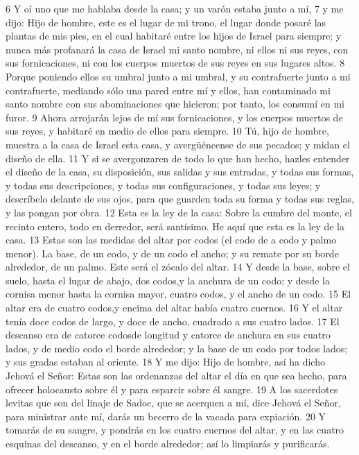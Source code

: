 6 Y oí uno que me hablaba desde la casa; y un varón estaba junto a mí,
7 y me dijo: Hijo de hombre, este es el lugar de mi trono, el lugar donde posaré las plantas de mis pies, en el cual habitaré entre los hijos de Israel para siempre; y nunca más profanará la casa de Israel mi santo nombre, ni ellos ni sus reyes, con sus fornicaciones, ni con los cuerpos muertos de sus reyes en sus lugares altos.
8 Porque poniendo ellos su umbral junto a mi umbral, y su contrafuerte junto a mi contrafuerte, mediando sólo una pared entre mí y ellos, han contaminado mi santo nombre con sus abominaciones que hicieron; por tanto, los consumí en mi furor.
9 Ahora arrojarán lejos de mí sus fornicaciones, y los cuerpos muertos de sus reyes, y habitaré en medio de ellos para siempre.
10 Tú, hijo de hombre, muestra a la casa de Israel esta casa, y avergüéncense de sus pecados; y midan el diseño de ella.
11 Y si se avergonzaren de todo lo que han hecho, hazles entender el diseño de la casa, su disposición, sus salidas y sus entradas, y todas sus formas, y todas sus descripciones, y todas sus configuraciones, y todas sus leyes; y descríbelo delante de sus ojos, para que guarden toda su forma y todas sus reglas, y las pongan por obra.
12 Esta es la ley de la casa: Sobre la cumbre del monte, el recinto entero, todo en derredor, será santísimo. He aquí que esta es la ley de la casa.
13 Estas son las medidas del altar por codos (el codo de a codo y palmo menor). La base, de un codo, y de un codo el ancho; y su remate por su borde alrededor, de un palmo. Este será el zócalo del altar.
14 Y desde la base, sobre el suelo, hasta el lugar de abajo, dos codos,y la anchura de un codo; y desde la cornisa menor hasta la cornisa mayor, cuatro codos, y el ancho de un codo.
15 El altar era de cuatro codos,y encima del altar había cuatro cuernos.
16 Y el altar tenía doce codos de largo, y doce de ancho, cuadrado a sus cuatro lados.
17 El descanso era de catorce codosde longitud y catorce de anchura en sus cuatro lados, y de medio codo el borde alrededor; y la base de un codo por todos lados; y sus gradas estaban al oriente. 
18 Y me dijo: Hijo de hombre, así ha dicho Jehová el Señor: Estas son las ordenanzas del altar el día en que sea hecho, para ofrecer holocausto sobre él y para esparcir sobre él sangre.
19 A los sacerdotes levitas que son del linaje de Sadoc, que se acerquen a mí, dice Jehová el Señor, para ministrar ante mí, darás un becerro de la vacada para expiación.
20 Y tomarás de su sangre, y pondrás en los cuatro cuernos del altar, y en las cuatro esquinas del descanso, y en el borde alrededor; así lo limpiarás y purificarás. 
